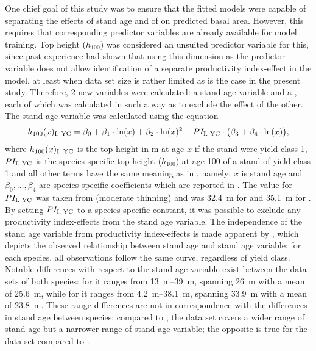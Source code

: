 One chief goal of this study was to ensure that the fitted models were capable of separating the effects of stand age and of \ProductivityIndexText{} on predicted basal area.  However, this requires that corresponding predictor variables are already available for model training.  Top height (\(h_{100}\)) was considered an unsuited predictor variable for this, since past experience had shown that using this dimension as the predictor variable does not allow identification of a separate productivity index-effect in the model, at least when data set size is rather limited as is the case in the present study.  Therefore, 2 new variables were calculated:  a stand age variable and a \ProductivityIndexVariableText{}, each of which was calculated in such a way as to exclude the effect of the other. The stand age variable was calculated using the equation
\begin{equation}
  \label{eq:StandAgeVariable}
  h_{100}(x)_{\text{I. YC}}{} = \beta_0 + \beta_1 \cdot \ln(x) + \beta_2 \cdot \ln(x)^2 + PI_{\text{I. YC}}{} \cdot \bigl(\beta_3 + \beta_4 \cdot \ln(x)\bigr),
\end{equation}
where \(h_{100}(x)_{\text{I. YC}}{}\) is the top height in \si{\meter} at age \(x\) if the stand were yield class 1, \(PI_{\text{I. YC}}{}\) is the species-specific top height (\(h_{100}\)) at age \SI{100}{\year} of a stand of yield class 1 and all other terms have the same meaning as in , namely: \(x\) is stand age and \(\beta_0, \ldots, \beta_4\) are species-specific coefficients which are reported in  \parencite{Nagel1999}.  The value for \(PI_{\text{I. YC}}{}\) was taken from \textcite{Schober1995} (moderate thinning) and was \SI{32.4}{\meter} for \Beech{} and \SI{35.1}{\meter} for \Spruce{}.  By setting \(PI_{\text{I. YC}}{}\) to a species-specific constant, it was possible to exclude any productivity index-effects from the stand age variable.  The independence of the stand age variable from productivity index-effects is made apparent by , which depicts the observed relationship between stand age and stand age variable:  for each species, all observations follow the same curve, regardless of yield class.  Notable differences with respect to the stand age variable exist between the data sets of both species:  for \Beech{} it ranges from \SIrange{13}{39}{\meter}, spanning \SI{26}{\meter} with a mean of \SI{25.6}{\meter}, while for \Spruce{} it ranges from \SIrange{4.2}{38.1}{\meter}, spanning \SI{33.9}{\meter} with a mean of \SI{23.8}{\meter}.  These range differences are not in correspondence with the differences in stand age between species:  compared to \Spruce{}, the \Beech{} data set covers a wider range of stand age but a narrower range of stand age variable;  the opposite is true for the \Spruce{} data set compared to \Beech{}.

